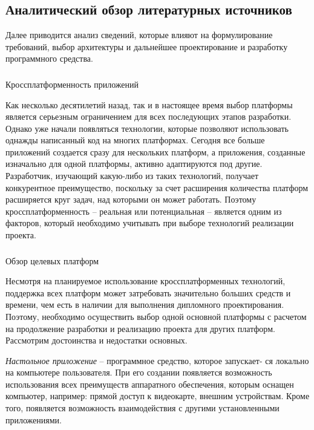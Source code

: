 \subsection{Аналитический обзор литературных источников}
\label{sec:analysis:literature}

Далее приводится анализ сведений, которые влияют на формулирование требований, выбор архитектуры и дальнейшее проектирование и разработку программного средства.

\subsubsection{} Кроссплатформенность приложений
\label{sec:analysis:literature:crossplatform}

Как несколько десятилетий назад, так и в настоящее время выбор платформы является серьезным ограничением для всех последующих этапов разработки. Однако уже начали появляться технологии, которые позволяют использовать однажды написанный код на многих платформах. Сегодня все больше приложений создается сразу для нескольких платформ, а приложения, созданные изначально для одной платформы, активно адаптируются под другие. %
Разработчик, изучающий какую-либо из таких технологий, получает конкурентное преимущество, поскольку за счет расширения количества платформ расширяется круг задач, над которыми он может работать. Поэтому кроссплатформенность -- реальная или потенциальная -- является одним из факторов, который необходимо учитывать при выборе технологий реализации проекта.

\subsubsection{} Обзор целевых платформ
\label{sec:analysis:literature:platforms}

Несмотря на планируемое использование кроссплатформенных технологий, поддержка всех платформ может затребовать значительно больших сред\-ств и времени, чем есть в наличии для выполнения дипломного проектирования. Поэтому, необходимо осуществить выбор одной основной платформы с расчетом на продолжение разработки и реализацию проекта для других платформ. Рассмотрим достоинства и недостатки основных.

\emph{Настольное приложение} – программное средство, которое запускает- ся локально на компьютере пользователя. При его создании появляется возможность использования всех преимуществ аппаратного обеспечения, которым оснащен компьютер, например: прямой доступ к видеокарте, внешним устройствам. Кроме того, появляется возможность взаимодействия с другими установленными приложениями.

